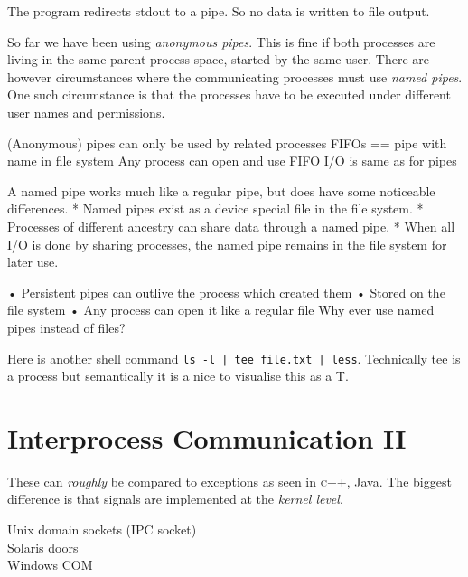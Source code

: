 
The program redirects stdout to a pipe. So no data is written to file output.

\frmrule

So far we have been using \textit{anonymous pipes}. This is fine if both 
processes are living in the same parent process space, 
started by the same user. 
There are however circumstances where the communicating processes
must use \textit{named pipes}. One such circumstance is that the processes have to be executed under different user names and permissions.


(Anonymous) pipes can only be used by related 
processes
FIFOs == pipe with name in file system
Any process can open and use FIFO
I/O is same as for pipes

A named pipe works much like a regular pipe, but does have
some noticeable differences.
* Named pipes exist as a device special file in the file
system.
* Processes of different ancestry can share data through a
named pipe.
* When all I/O is done by sharing processes, the named 
pipe remains in the file system for later use.

• Persistent pipes can outlive the process which 
created them
• Stored on the file system
• Any process can open it like a regular file
 Why ever use named pipes instead of files?


\begin{example}
Here is another shell command \lstinline{ls -l | tee file.txt | less}.
Technically tee is a process but semantically it is a nice to
visualise this as a T. 
\end{example}



\section{Interprocess Communication II}



These can \textit{roughly} be compared to exceptions as seen in \textsc{c}++, Java.
The biggest difference is that signals are implemented at the \textit{kernel level}. 


Unix domain sockets (IPC socket) \\
Solaris doors \\
Windows COM \\


